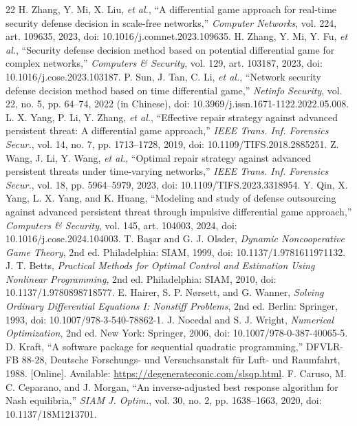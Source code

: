 \documentclass[conference,letterpaper]{IEEEtran}
\begin{document}
\begin{thebibliography}{22}
 H. Zhang, Y. Mi, X. Liu, \emph{et al.}, ``A differential game approach for real-time security defense decision in scale-free networks,'' \emph{Computer Networks}, vol. 224, art. 109635, 2023, doi: 10.1016/j.comnet.2023.109635.
 H. Zhang, Y. Mi, Y. Fu, \emph{et al.}, ``Security defense decision method based on potential differential game for complex networks,'' \emph{Computers \& Security}, vol. 129, art. 103187, 2023, doi: 10.1016/j.cose.2023.103187.
 P. Sun, J. Tan, C. Li, \emph{et al.}, ``Network security defense decision method based on time differential game,'' \emph{Netinfo Security}, vol. 22, no. 5, pp. 64--74, 2022 (in Chinese), doi: 10.3969/j.issn.1671-1122.2022.05.008.
 L. X. Yang, P. Li, Y. Zhang, \emph{et al.}, ``Effective repair strategy against advanced persistent threat: A differential game approach,'' \emph{IEEE Trans. Inf. Forensics Secur.}, vol. 14, no. 7, pp. 1713--1728, 2019, doi: 10.1109/TIFS.2018.2885251.
 Z. Wang, J. Li, Y. Wang, \emph{et al.}, ``Optimal repair strategy against advanced persistent threats under time-varying networks,'' \emph{IEEE Trans. Inf. Forensics Secur.}, vol. 18, pp. 5964--5979, 2023, doi: 10.1109/TIFS.2023.3318954.
 Y. Qin, X. Yang, L. X. Yang, and K. Huang, ``Modeling and study of defense outsourcing against advanced persistent threat through impulsive differential game approach,'' \emph{Computers \& Security}, vol. 145, art. 104003, 2024, doi: 10.1016/j.cose.2024.104003.
 T. Ba\c{s}ar and G. J. Olsder, \emph{Dynamic Noncooperative Game Theory}, 2nd ed. Philadelphia: SIAM, 1999, doi: 10.1137/1.9781611971132.
 J. T. Betts, \emph{Practical Methods for Optimal Control and Estimation Using Nonlinear Programming}, 2nd ed. Philadelphia: SIAM, 2010, doi: 10.1137/1.9780898718577.
 E. Hairer, S. P. N\o rsett, and G. Wanner, \emph{Solving Ordinary Differential Equations I: Nonstiff Problems}, 2nd ed. Berlin: Springer, 1993, doi: 10.1007/978-3-540-78862-1.
 J. Nocedal and S. J. Wright, \emph{Numerical Optimization}, 2nd ed. New York: Springer, 2006, doi: 10.1007/978-0-387-40065-5.
 D. Kraft, ``A software package for sequential quadratic programming,'' DFVLR-FB 88-28, Deutsche Forschungs- und Versuchsanstalt f\"ur Luft- und Raumfahrt, 1988. [Online]. Available: \url{https://degenerateconic.com/slsqp.html}.
 F. Caruso, M. C. Ceparano, and J. Morgan, ``An inverse-adjusted best response algorithm for Nash equilibria,'' \emph{SIAM J. Optim.}, vol. 30, no. 2, pp. 1638--1663, 2020, doi: 10.1137/18M1213701.
\end{thebibliography}
\end{document}
